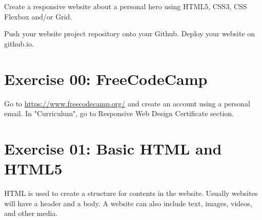 \documentclass{42-en}
\begin{document}
Create a responsive website about a personal hero using HTML5, CSS3, CSS Flexbox and/or Grid.\par
\vspace{0.2in}
Push your website project repository onto your Github. Deploy your website on github.io.
    



\chapter{Exercise 00: FreeCodeCamp}

\exnumber{\exercicenumber}

\makeheaderfiles

Go to \url{https://www.freecodecamp.org/} and create an account using a personal email. In "Curriculum", go to Responsive Web Design Certificate section.


\chapter{Exercise 01: Basic HTML and HTML5}

\exnumber{\exercicenumber}

\makeheaderfiles

HTML is used to create a structure for contents in the website. Usually websites will have a header and a body. A website can also include text, images, videos, and other media.
\end{document}
